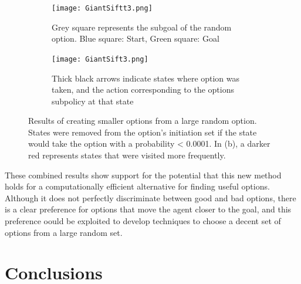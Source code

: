 \documentclass{acm_proc_article-sp}
\begin{document}
\begin{figure}[!htbp]
  \begin{subfigure}[h]{.4\textwidth}
  	\centering
    \texttt{[image: GiantSiftt3.png]}
    \caption{Grey square represents the subgoal of the random option. Blue square: Start, Green square: Goal}
  \end{subfigure}\hfill
  \begin{subfigure}[h]{.4\textwidth}
  \centering
    \texttt{[image: GiantSift3.png]}
    \caption{Thick black arrows indicate states where option was taken, and the action corresponding to the options subpolicy at that state}
  \end{subfigure}
  \caption{Results of creating smaller options from a large random option. States were removed from the option's initiation set if the state would take the option with a probability < 0.0001. In (b), a darker red represents states that were visited more frequently.}
\end{figure}

These combined results show support for the potential that this new method holds for a computationally efficient alternative for finding useful options. Although it does not perfectly discriminate between good and bad options, there is a clear preference for options that move the agent closer to the goal, and this preference oould be exploited to develop techniques to choose a decent set of options from a large random set. 

\section{Conclusions}

\end{document}
